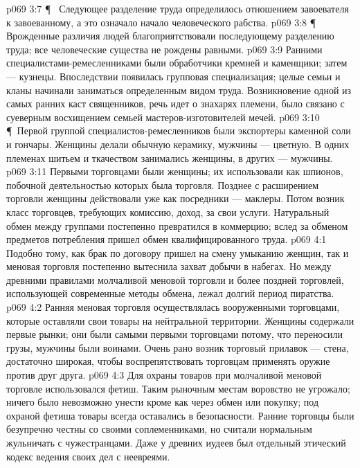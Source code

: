 \vs p069 3:7 \P\ \bibnobreakspace {} Следующее разделение труда определилось отношением завоевателя к завоеванному, а это означало начало человеческого рабства.
\vs p069 3:8 \P\ \bibnobreakspace {} Врожденные различия людей благоприятствовали последующему разделению труда; все человеческие существа не рождены равными.
\vs p069 3:9 Ранними специалистами\hyp{}ремесленниками были обработчики кремней и каменщики; затем --- кузнецы. Впоследствии появилась групповая специализация; целые семьи и кланы начинали заниматься определенным видом труда. Возникновение одной из самых ранних каст священников, речь идет о знахарях племени, было связано с суеверным восхищением семьей мастеров\hyp{}изготовителей мечей.
\vs p069 3:10 \P\ Первой группой специалистов\hyp{}ремесленников были экспортеры каменной соли и гончары. Женщины делали обычную керамику, мужчины --- цветную. В одних племенах шитьем и ткачеством занимались женщины, в других --- мужчины.
\vs p069 3:11 Первыми торговцами были женщины; их использовали как шпионов, побочной деятельностью которых была торговля. Позднее с расширением торговли женщины действовали уже как посредники --- маклеры. Потом возник класс торговцев, требующих комиссию, доход, за свои услуги. Натуральный обмен между группами постепенно превратился в коммерцию; вслед за обменом предметов потребления пришел обмен квалифицированного труда.
\vs p069 4:1 Подобно тому, как брак по договору пришел на смену умыканию женщин, так и меновая торговля постепенно вытеснила захват добычи в набегах. Но между древними правилами молчаливой меновой торговли и более поздней торговлей, использующей современные методы обмена, лежал долгий период пиратства.
\vs p069 4:2 Ранняя меновая торговля осуществлялась вооруженными торговцами, которые оставляли свои товары на нейтральной территории. Женщины содержали первые рынки; они были самыми первыми торговцами потому, что переносили грузы, мужчины были воинами. Очень рано возник торговый прилавок --- стена, достаточно широкая, чтобы воспрепятствовать торговцам применять оружие против друг друга.
\vs p069 4:3 Для охраны товаров при молчаливой меновой торговле использовался фетиш. Таким рыночным местам воровство не угрожало; ничего было невозможно унести кроме как через обмен или покупку; под охраной фетиша товары всегда оставались в безопасности. Ранние торговцы были безупречно честны со своими соплеменниками, но считали нормальным жульничать с чужестранцами. Даже у древних иудеев был отдельный этический кодекс ведения своих дел с неевреями.
